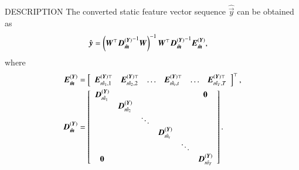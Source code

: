 \begin{qsection}{DESCRIPTION}
 The converted static feature vector sequence $\hat{\vec{y}}$ can be obtained as
 \begin{align*}
  \hat{\vec{y}} &=\left(\W\trans {\vec{D}\dim{\sY}_{\hat{\sm}}}\inv \W\right)\inv
  \W\trans {\vec{D}\dim{\sY}_{\hat{\sm}}}\inv \vec{E}\dim{\sY}_{\hat{\sm}},
 \end{align*}
 where
 \begin{align*}
 \vec{E}\dim{\sY}_{\hat{\sm}}
  &= \left[
  \begin{array}{cccccc}
   \vec{E}^{(\sY)\top}_{\scriptstyle \hat{m_1}, 1}
    &
    \vec{E}^{(\sY)\top}_{\scriptstyle \hat{m_2}, 2}
    &
    \ldots
    &
    \vec{E}^{(\sY)\top}_{\scriptstyle \hat{m_t}, t}
    &
    \ldots
    &
    \vec{E}^{(\sY)\top}_{\scriptstyle \hat{m_T}, T}
  \end{array}
  \right]\trans,\\
   \vec{D}\dim{\sY}_{\hat{\sm}} &=
  \left[
   \begin{array}{cccccc}
    \vec{D}\dim{\sY}_{\scriptstyle \hat{m_1}} & & & & & \vec{0}\\
    & \vec{D}\dim{\sY}_{\scriptstyle \hat{m_2}}  & & & & \\
    & & \ddots  & & & \\
    & & & \vec{D}\dim{\sY}_{\scriptstyle \hat{m_t}} & &  \\
    & & & & \ddots & \\
    \vec{0} & & & & &
     \vec{D}\dim{\sY}_{\scriptstyle \hat{m_T}}
   \end{array}
  \right].
\end{align*}


\end{qsection}

